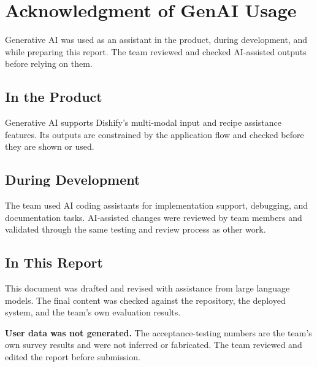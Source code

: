 \chapter{Acknowledgment of GenAI Usage}
\label{ch:genai-usage}

Generative AI was used as an assistant in the product, during development, and
while preparing this report. The team reviewed and checked AI-assisted outputs
before relying on them.

\section{In the Product}

Generative AI supports Dishify's multi-modal input and recipe assistance
features. Its outputs are constrained by the application flow and checked before
they are shown or used.

\section{During Development}

The team used AI coding assistants for implementation support, debugging, and
documentation tasks. AI-assisted changes were reviewed by team members and
validated through the same testing and review process as other work.

\section{In This Report}

This document was drafted and revised with assistance from large language
models. The final content was checked against the repository, the deployed
system, and the team's own evaluation results.

\noindent
\textbf{User data was not generated.} The acceptance-testing numbers are the
team's own survey results and were not inferred or fabricated. The team reviewed
and edited the report before submission.
